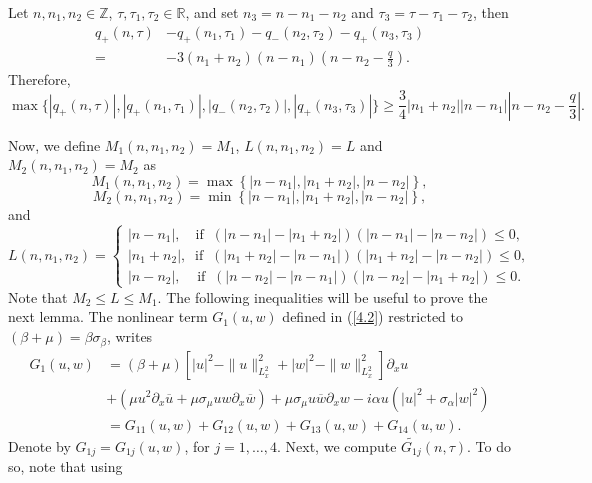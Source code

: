 \documentclass[reqno]{amsart}
\numberwithin{equation}{section}
\begin{document}
Let $n,n_{1},n_{2}\in\mathbb{Z}$,
$\tau,\tau_{1},\tau_{2}\in\mathbb{R}$, and set $n_3=n-n_1-n_2$ and $\tau_3=\tau-\tau_1-\tau_2$,
then
\begin{equation}\label{4.22}
\begin{split}
q_{+}(n,\tau)&-q_{+}(n_1,\tau_1)-q_{-}(n_2,\tau_2)-q_{+}
(n_3,\tau_3)\\
=&-3(n_{1}+n_{2})(n-n_{1})(n-n_{2}-\frac{q}{3}).
\end{split}
\end{equation}
Therefore,
\begin{equation*}
\max\{|q_{+}(n,\tau)|,|q_{+}(n_1,\tau_1)|,|q_{-}(n_2,\tau_2)|,|q_{+}(n_3,\tau_3)|\}
\geq\frac{3}{4}| n_{1}+n_{2}| |n-n_{1}| | n-n_{2}-\frac{q}3|.
\end{equation*}

Now, we define $M_{1}\left(n,n_{1},n_{2}\right)=M_{1}$, $L\left(n,n_{1},n_{2}\right)=L$ and
$M_{2}\left(n,n_{1},n_{2}\right)=M_{2} $ as
\[
M_{1}\left(n,n_{1},n_{2}\right)=\max\left\{  |n-n_{1}| ,| n_{1}+n_{2}|, |n-n_{2}| \right\},
\]
\[
M_{2}\left(n,n_{1},n_{2}\right)=\min\left\{|n-n_1|, | n_1+n_2|, |n-n_2|\right\},
\]
and
\begin{equation*}
L(n,n_1,n_2)=
\begin{cases}
|n-n_{1}|,\;\;\;\,  \text{if}\;\;(|n-n_1|-|n_1+n_2|)(|n-n_1|-|n-n_2|)\leq 0,\\
| n_1+n_2|,\;\; \text{if}\;\;(| n_1+n_2|-|n-n_1|)(
|n_1+n_2|-|n-n_2|)  \leq 0,\\
|n-n_2|,\;\;\;\; \text{if}\;\;(| n-n_2|-|n-n_1|)(|n-n_2|-| n_1+n_2|)\leq 0.
\end{cases}
\end{equation*}
Note that $M_2\leq L\leq M_1$. The following inequalities will be
useful to prove the next lemma. The nonlinear term $G_{1}(u,w)$
defined in (\ref{4.2}) restricted to $\left( \beta+\mu\right)
=\beta\sigma_{\beta}$, writes
\begin{align}\label{4.23}
G_{1}(u,w)  &  =\left(  \beta+\mu\right)  [| u|
^{2}-\| u\| _{L_{x}^{2}}^{2}+|
w|
^{2}-\| w\| _{L_{x}^{2}}^{2}]\partial_{x}u\\
&  +\left(  \mu
u^{2}\partial_{x}\overline{u}+\mu\sigma_{\mu}uw\partial
_{x}\overline{w}\right)
+\mu\sigma_{\mu}u\overline{w}\partial_{x}w-i\alpha u(|
u| ^{2}+\sigma_{\alpha}| w|
^{2})\nonumber\\
&=G_{11}(u,w)+G_{12}(u,w)+G_{13}(u,w)+G_{14}(u,w)\text{.}\nonumber
\end{align}
Denote by  $G_{1j}=G_{1j}(u,w)$, for $j=1,\dots, 4$. Next, we
compute $\widetilde{G_{1j}}(n,\tau)$. To do so, note that using
\end{document}
